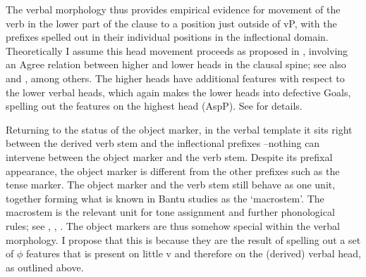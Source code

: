 \documentclass[output=paper
,modfonts
,nonflat]{langsci/langscibook}
\begin{document}
\begin{comment}
\begin{figure}[h!]
\begin{exe}
\ex \forestset{nice empty nodes/.style={for tree={calign=fixed edge angles}, delay={where content={}{shape=coordinate, for current and siblings={anchor=north}}{}}
		},
	} 
\begin{forest}
		[NegP, nice empty nodes
		[kha-] 
		[AgrSP
		[-mw-] 
		[TAM
		[-aa-]
		[AspP
		[-tsuwela\textsubscript{i}]
		[vP [t\textsubscript{i}, roof]
		] ] ] ]	]			
\end{forest}
\end{exe}
\end{figure}
\end{comment}


The verbal morphology thus provides empirical evidence for movement of the verb in the lower part of the clause to a position just outside of vP, with the prefixes spelled out in their individual positions in the inflectional domain. Theoretically I assume this head movement proceeds as proposed in \citet{Roberts2010}, involving an Agree relation between higher and lower heads in the clausal spine; see also \citet{Adger2003} and \citet{Bjorkman2011}, among others. The higher heads have additional features with respect to the lower verbal heads, which again makes the lower heads into defective Goals, spelling out the features on the highest head (AspP). See \citet{Roberts2010} for details.

Returning to the status of the object marker, in the verbal template it sits right between the derived verb stem and the inflectional prefixes –nothing can intervene between the object marker and the verb stem. Despite its prefixal appearance, the object marker is different from the other prefixes such as the tense marker. The object marker and the verb stem still behave as one unit, together forming what is known in Bantu studies as the ‘macrostem’. The macrostem is the relevant unit for tone assignment and further phonological rules; see \citet{Hyman2003}, \citet{Hyman_et_al2008}, \citet{Marlo2015}. The object markers are thus somehow special within the verbal morphology. I propose that this is because they are the result of spelling out a set of $\phi$ features that is present on little v and therefore on the (derived) verbal head, as outlined above.
\end{document}
